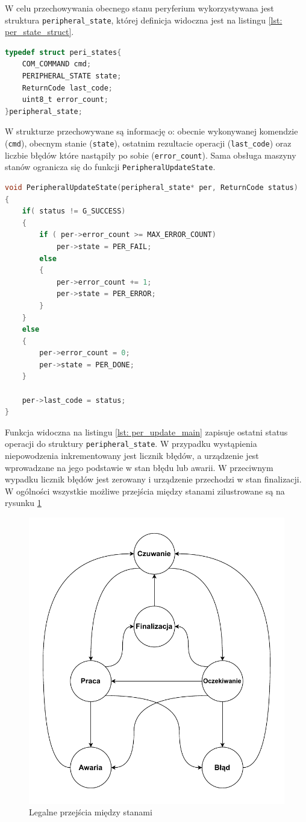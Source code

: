 W celu przechowywania obecnego stanu peryferium wykorzystywana jest struktura \texttt{peripheral\_state}, której definicja widoczna jest na listingu \ref{lst: per_state_struct}.
\begin{lstlisting}[language=C,
    caption={Definicja struktury peripheral\_state w pliku \texttt{system\_logic.h}},
    label={lst: per_state_struct}]
typedef struct peri_states{
	COM_COMMAND cmd;
	PERIPHERAL_STATE state;
	ReturnCode last_code;
	uint8_t error_count;
}peripheral_state;
\end{lstlisting}
W strukturze przechowywane są informację o: obecnie wykonywanej komendzie (\texttt{cmd}), obecnym stanie (\texttt{state}), ostatnim rezultacie operacji (\texttt{last\_code}) oraz liczbie błędów które nastąpiły po sobie (\texttt{error\_count}). Sama obsługa maszyny stanów ogranicza się do funkcji \texttt{PeripheralUpdateState}.
\begin{lstlisting}[language=C,
    caption={Definicja funkcji \texttt{PeripheralUpdateState}},
    label={lst: per_update_main}]
void PeripheralUpdateState(peripheral_state* per, ReturnCode status)
{
	if( status != G_SUCCESS)
	{
		if ( per->error_count >= MAX_ERROR_COUNT)
			per->state = PER_FAIL;
		else
		{
			per->error_count += 1;
			per->state = PER_ERROR;
		}
	}
	else
	{
		per->error_count = 0;
		per->state = PER_DONE;
	}

	per->last_code = status;
}
\end{lstlisting}
Funkcja widoczna na listingu \ref{lst: per_update_main} zapisuje ostatni status operacji do struktury \texttt{peripheral\_state}. W przypadku wystąpienia niepowodzenia inkrementowany jest licznik błędów, a urządzenie jest wprowadzane na jego podstawie w stan błędu lub awarii. W przeciwnym wypadku licznik błędów jest zerowany i urządzenie przechodzi w stan finalizacji. W ogólności wszystkie możliwe przejścia między stanami zilustrowane są na rysunku \ref{fig: legal_state}
    
\begin{figure}[ht!]
    \centering
    \includegraphics[width=0.55\linewidth]{rysunki/main_program/per_state_machine.pdf}
    \caption{Legalne przejścia między stanami}
    \label{fig: legal_state}
\end{figure} 

